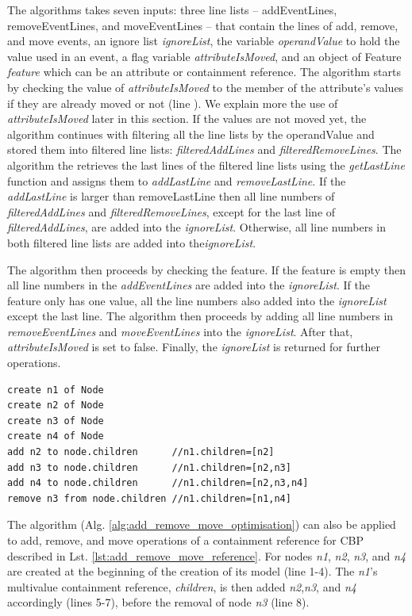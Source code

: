 \documentclass[sigconf]{acmart}
\begin{document}
The algorithms takes seven inputs: three line lists -- addEventLines, removeEventLines, and moveEventLines -- that contain the lines of add, remove, and move events, an ignore list \emph{ignoreList}, the variable \emph{operandValue} to hold the value used in an event, a flag variable \emph{attributeIsMoved}, and an object of Feature \emph{feature} which can be an attribute or containment reference. The algorithm starts by checking the value of \emph{attributeIsMoved} to the member of the attribute's values if they are already moved or not (line ). We explain more the use of \emph{attributeIsMoved} later in this section. If the values are not moved yet, the algorithm continues with filtering all the line lists by the operandValue and stored them into filtered line lists: \emph{filteredAddLines} and \emph{filteredRemoveLines}. The algorithm the retrieves the last lines of the filtered line lists using the \emph{getLastLine} function and assigns them to \emph{addLastLine} and \emph{removeLastLine}. If the \emph{addLastLine} is larger than {removeLastLine} then all line numbers of \emph{filteredAddLines} and \emph{filteredRemoveLines}, except for the last line of \emph{filteredAddLines}, are added into the \emph{ignoreList}. Otherwise, all line numbers in both filtered line lists are added into the\emph{ignoreList}.

The algorithm then proceeds by checking the feature. If the feature is empty then all line numbers in the \emph{addEventLines} are added into the \emph{ignoreList}. If the feature only has one value, all the line numbers also added into the \emph{ignoreList} except the last line. The algorithm then proceeds by adding all line numbers in \emph{removeEventLines} and \emph{moveEventLines} into the \emph{ignoreList}. After that, \emph{attributeIsMoved} is set to false. Finally, the \emph{ignoreList} is returned for further operations.    

\begin{lstlisting}[style=eol,caption={Example of CBP representation of attribute \emph{values}'s add and remove operations.},label=lst:add_remove_move_reference]
create n1 of Node
create n2 of Node
create n3 of Node
create n4 of Node
add n2 to node.children      //n1.children=[n2] 
add n3 to node.children      //n1.children=[n2,n3] 
add n4 to node.children      //n1.children=[n2,n3,n4] 
remove n3 from node.children //n1.children=[n1,n4] 
\end{lstlisting}

The algorithm (Alg. \ref{alg:add_remove_move_optimisation}) can also be applied to add, remove, and move operations of a containment reference for CBP described in Lst. \ref{lst:add_remove_move_reference}. For nodes \emph{n1}, \emph{n2}, \emph{n3}, and \emph{n4} are created at the beginning of the creation of its model (line 1-4). The \emph{n1}'s multivalue containment reference, \emph{children}, is then added \emph{n2},\emph{n3}, and \emph{n4} accordingly (lines 5-7), before the removal of node \emph{n3} (line 8). 
\end{document}
